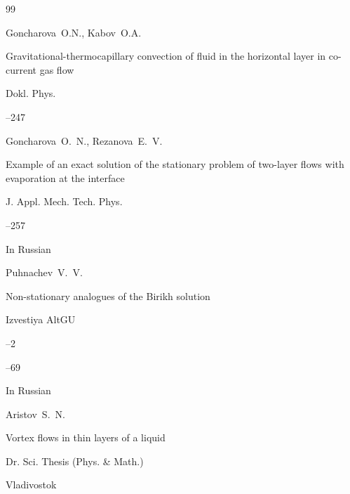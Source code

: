 \begin{thebibliography}{99}






\by Goncharova~O.N., Kabov~O.A.

\paper Gravitational-thermocapillary convection of fluid in the horizontal layer in co-current gas flow

\jour Dokl. Phys.




--247





\by Goncharova~O.~N., Rezanova~E.~V.

\paper 	Example of an exact solution of the stationary problem of two-layer flows with evaporation at the interface

\jour J. Appl. Mech. Tech. Phys.




--257







\lang In Russian

\by Puhnachev~V.~V.

\paper Non-stationary analogues of the Birikh solution

\jour  Izvestiya AltGU 


--2

--69






\lang In Russian

\by Aristov~S.~N.

\thesis Vortex flows in thin layers of a liquid

\thesisinfo Dr. Sci. Thesis (Phys. \& Math.)


\publaddr Vladivostok


\end{thebibliography}
